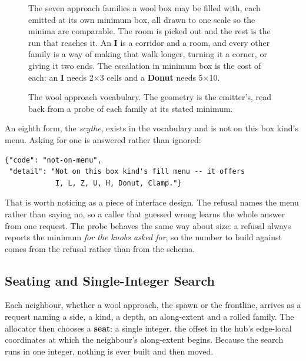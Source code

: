 \begin{figure}[htbp]
\centering


\medskip
{\small\begin{minipage}{0.95\textwidth}
The seven approach families a wool box may be filled with, each emitted at its own
minimum box, all drawn to one scale so the minima are comparable. The room is picked
out and the rest is the run that reaches it. An \textbf{I} is a corridor and a room,
and every other family is a way of making that walk longer, turning it a corner, or
giving it two ends. The escalation in minimum box is the cost of each: an \textbf{I}
needs 2$\times$3 cells and a \textbf{Donut} needs 5$\times$10.
\end{minipage}}
\caption{The wool approach vocabulary. The geometry is the emitter's, read back
from a probe of each family at its stated minimum.}
\label{fig:families}
\end{figure}

An eighth form, the \emph{scythe}, exists in the vocabulary and is not on this box
kind's menu. Asking for one is answered rather than ignored:

\begin{lstlisting}
{"code": "not-on-menu",
 "detail": "Not on this box kind's fill menu -- it offers
            I, L, Z, U, H, Donut, Clamp."}
\end{lstlisting}

That is worth noticing as a piece of interface design. The refusal names the menu
rather than saying no, so a caller that guessed wrong learns the whole answer from
one request. The probe behaves the same way about size: a  refusal
always reports the minimum \emph{for the knobs asked for}, so the number to build
against comes from the refusal rather than from the schema.

\subsection{Seating and Single-Integer Search}

Each neighbour, whether a wool approach, the spawn or the frontline, arrives as a
request naming a side, a kind, a depth, an along-extent and a rolled family. The
allocator then chooses a \textbf{seat}: a single integer, the offset in the hub's
edge-local coordinates at which the neighbour's along-extent begins. Because the
search runs in one integer, nothing is ever built and then moved.

